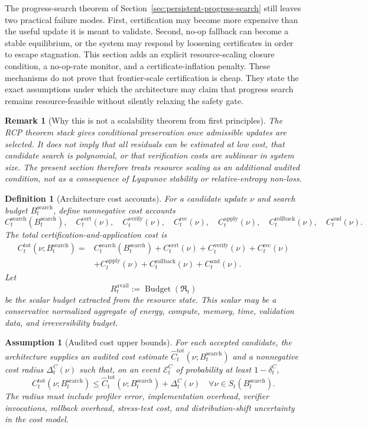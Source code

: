 \documentclass[11pt,a4paper]{article}
\newtheorem{definition}[theorem]{Definition}
\newtheorem{assumption}[theorem]{Assumption}
\newtheorem{remark}[theorem]{Remark}
\newcommand{\Ecal}{\mathcal E}
\newcommand{\rec}{\mathrm{rec}}
\newcommand{\aud}{\mathrm{aud}}
\newcommand{\Budget}{\operatorname{Budget}}
\newcommand{\verify}{\mathrm{verify}}
\newcommand{\search}{\mathrm{search}}
\newcommand{\cert}{\mathrm{cert}}
\newcommand{\apply}{\mathrm{apply}}
\newcommand{\tot}{\mathrm{tot}}
\newcommand{\avail}{\mathrm{avail}}
\newcommand{\rollback}{\mathrm{rollback}}
\begin{document}
The progress-search theorem of Section~\ref{sec:persistent-progress-search} still leaves two practical failure modes. First, certification may become more expensive than the useful update it is meant to validate. Second, no-op fallback can become a stable equilibrium, or the system may respond by loosening certificates in order to escape stagnation. This section adds an explicit resource-scaling closure condition, a no-op-rate monitor, and a certificate-inflation penalty. These mechanisms do not prove that frontier-scale certification is cheap. They state the exact assumptions under which the architecture may claim that progress search remains resource-feasible without silently relaxing the safety gate.

\begin{remark}[Why this is not a scalability theorem from first principles]
The RCP theorem stack gives conditional preservation once admissible updates are selected. It does not imply that all residuals can be estimated at low cost, that candidate search is polynomial, or that verification costs are sublinear in system size. The present section therefore treats resource scaling as an additional audited condition, not as a consequence of Lyapunov stability or relative-entropy non-loss.
\end{remark}

\begin{definition}[Architecture cost accounts]
\label{def:architecture-cost-accounts}
For a candidate update \(\nu\) and search budget \(B_t^{\search}\), define nonnegative cost accounts
\[
C_t^{\search}(B_t^{\search}),\quad
C_t^{\cert}(\nu),\quad
C_t^{\verify}(\nu),\quad
C_t^{\rec}(\nu),\quad
C_t^{\apply}(\nu),\quad
C_t^{\rollback}(\nu),\quad
C_t^{\aud}(\nu).
\]
The total certification-and-application cost is
\[
\begin{aligned}
C_t^{\tot}(\nu;B_t^{\search})
={}&
C_t^{\search}(B_t^{\search})+C_t^{\cert}(\nu)+C_t^{\verify}(\nu)+C_t^{\rec}(\nu)\\
&+C_t^{\apply}(\nu)+C_t^{\rollback}(\nu)+C_t^{\aud}(\nu).
\end{aligned}
\]
Let
\[
R_t^{\avail}:=\Budget(\mathfrak R_t)
\]
be the scalar budget extracted from the resource state. This scalar may be a conservative normalized aggregate of energy, compute, memory, time, validation data, and irreversibility budget.
\end{definition}

\begin{assumption}[Audited cost upper bounds]
\label{ass:audited-cost-upper-bounds}
For each accepted candidate, the architecture supplies an audited cost estimate \(\widehat C_t^{\tot}(\nu;B_t^{\search})\) and a nonnegative cost radius \(\Delta_t^C(\nu)\) such that, on an event \(\Ecal_t^C\) of probability at least \(1-\delta_t^C\),
\[
C_t^{\tot}(\nu;B_t^{\search})
\le
\widehat C_t^{\tot}(\nu;B_t^{\search})+\Delta_t^C(\nu)
\quad
\forall \nu\in S_t(B_t^{\search}).
\]
The radius must include profiler error, implementation overhead, verifier invocations, rollback overhead, stress-test cost, and distribution-shift uncertainty in the cost model.
\end{assumption}
\end{document}
